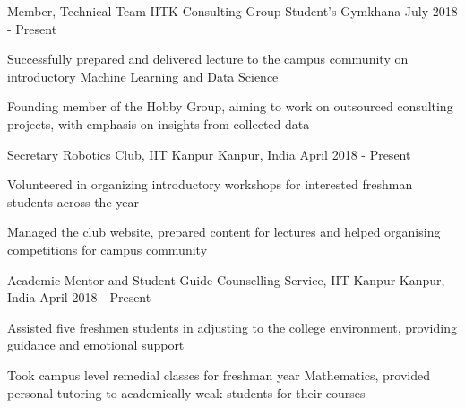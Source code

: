 \begin{cventries}

 \cventry
    {Member, Technical Team}
    {IITK Consulting Group}
    {Student's Gymkhana} 
    {July 2018 - Present}
    {
      \begin{cvitems}
        \item {Successfully prepared and delivered lecture to the campus community on introductory Machine Learning and Data Science}
        \item {Founding member of the Hobby Group, aiming to work on outsourced consulting projects, with emphasis on insights from collected data}
      \end{cvitems}
    }

  \cventry
    {Secretary}
    {Robotics Club, IIT Kanpur}
    {Kanpur, India} 
    {April 2018 - Present} 
    {
      \begin{cvitems}
        \item {Volunteered in organizing introductory workshops for interested freshman students across the year}
        \item{Managed the club website, prepared content for lectures and helped organising competitions for campus community}
        \end{cvitems}
    }

  \cventry
    {Academic Mentor and Student Guide}
    {Counselling Service, IIT Kanpur}
    {Kanpur, India}
    {April 2018 - Present}
    {
      \begin{cvitems} %
        \item {Assisted five freshmen students in adjusting to the college environment, providing guidance and emotional support}
        \item{Took campus level remedial classes for freshman year Mathematics, provided personal tutoring to academically weak students for their courses}
      \end{cvitems}
    }

\end{cventries}
